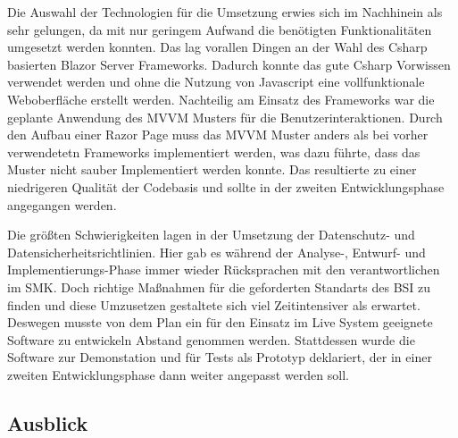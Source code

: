 Die Auswahl der Technologien für die Umsetzung erwies sich im Nachhinein als sehr gelungen, da mit nur geringem Aufwand die benötigten Funktionalitäten umgesetzt werden konnten. Das lag vorallen Dingen an der Wahl des Csharp basierten Blazor Server Frameworks. Dadurch konnte das gute Csharp Vorwissen verwendet werden und ohne die Nutzung von Javascript eine vollfunktionale Weboberfläche erstellt werden. Nachteilig am Einsatz des Frameworks war die geplante Anwendung des MVVM Musters für die Benutzerinteraktionen. Durch den Aufbau einer Razor Page muss das MVVM Muster anders als bei vorher verwendetetn Frameworks implementiert werden, was dazu führte, dass das Muster nicht sauber Implementiert werden konnte. Das resultierte zu einer niedrigeren Qualität der Codebasis und sollte in der zweiten Entwicklungsphase angegangen werden.

Die größten Schwierigkeiten lagen in der Umsetzung der Datenschutz- und Datensicherheitsrichtlinien. Hier gab es während der Analyse-, Entwurf- und Implementierungs-Phase immer wieder Rücksprachen mit den verantwortlichen im SMK. Doch richtige Maßnahmen für die geforderten Standarts des BSI zu finden und diese Umzusetzen gestaltete sich viel Zeitintensiver als erwartet. Deswegen musste von dem Plan ein für den Einsatz im Live System geeignete Software zu entwickeln Abstand genommen werden. Stattdessen wurde die Software zur Demonstation und für Tests als Prototyp deklariert, der in einer zweiten Entwicklungsphase dann weiter angepasst werden soll.

\subsection{Ausblick}
\label{sec:Ausblick}



